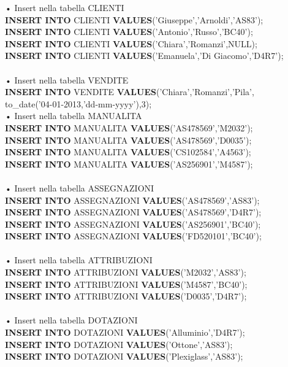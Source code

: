 \documentclass[a4paper,12pt,italian]{article}
\begin{document}
• Insert nella tabella CLIENTI \\
\textbf{INSERT INTO} CLIENTI \textbf{VALUES}('Giuseppe','Arnoldi','AS83'); \\
\textbf{INSERT INTO} CLIENTI \textbf{VALUES}('Antonio','Russo','BC40'); \\
\textbf{INSERT INTO} CLIENTI \textbf{VALUES}('Chiara','Romanzi',NULL); \\
\textbf{INSERT INTO} CLIENTI \textbf{VALUES}('Emanuela','Di Giacomo','D4R7'); \\ \\
• Insert nella tabella VENDITE \\
\textbf{INSERT INTO} VENDITE \textbf{VALUES}('Chiara','Romanzi','Pila',\\to\_date('04-01-2013,'dd-mm-yyyy'),3); \\
• Insert nella tabella MANUALITA \\
\textbf{INSERT INTO} MANUALITA \textbf{VALUES}('AS478569','M2032'); \\
\textbf{INSERT INTO} MANUALITA \textbf{VALUES}('AS478569','D0035'); \\
\textbf{INSERT INTO} MANUALITA \textbf{VALUES}('CS102584','A4563'); \\
\textbf{INSERT INTO} MANUALITA \textbf{VALUES}('AS256901','M4587'); \\ \\
• Insert nella tabella ASSEGNAZIONI \\
\textbf{INSERT INTO} ASSEGNAZIONI \textbf{VALUES}('AS478569','AS83'); \\
\textbf{INSERT INTO} ASSEGNAZIONI \textbf{VALUES}('AS478569','D4R7'); \\
\textbf{INSERT INTO} ASSEGNAZIONI \textbf{VALUES}('AS256901','BC40'); \\
\textbf{INSERT INTO} ASSEGNAZIONI \textbf{VALUES}('FD520101','BC40'); \\ \\
• Insert nella tabella ATTRIBUZIONI \\
\textbf{INSERT INTO} ATTRIBUZIONI \textbf{VALUES}('M2032','AS83'); \\
\textbf{INSERT INTO} ATTRIBUZIONI \textbf{VALUES}('M4587','BC40'); \\
\textbf{INSERT INTO} ATTRIBUZIONI \textbf{VALUES}('D0035','D4R7'); \\ \\
• Insert nella tabella DOTAZIONI \\
\textbf{INSERT INTO} DOTAZIONI \textbf{VALUES}('Alluminio','D4R7'); \\
\textbf{INSERT INTO} DOTAZIONI \textbf{VALUES}('Ottone','AS83'); \\
\textbf{INSERT INTO} DOTAZIONI \textbf{VALUES}('Plexiglass','AS83'); \\ \\
\end{document}
